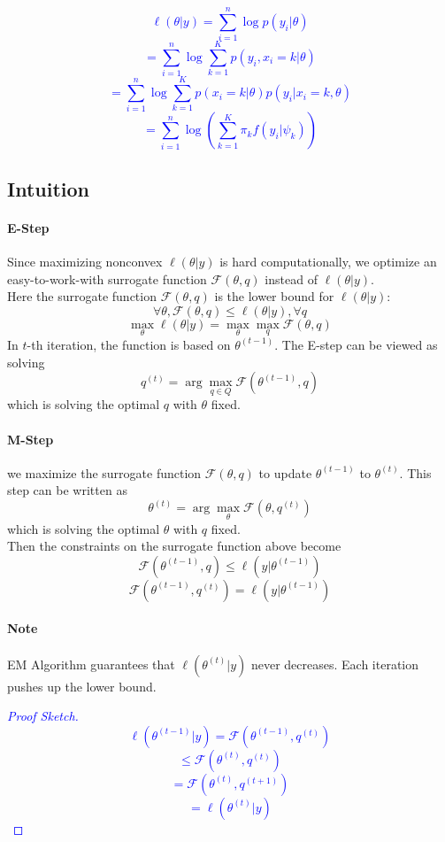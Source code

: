 \documentclass[12pt]{book}
\theoremstyle{definition}
\theoremstyle{remark}
\begin{document}
\textcolor{blue}{
\[\ell (\theta|y) = \sum_{i=1}^n \log p(y_i|\theta)\]
\[= \sum_{i=1}^n \log \sum_{k=1}^K p(y_i, x_i = k|\theta)\]
\[= \sum_{i=1}^n \log \sum_{k=1}^K p(x_i = k|\theta)p(y_i|x_i = k,\theta)\]
\[ = \sum_{i=1}^n \log (\sum_{k=1}^K\pi_k f(y_i|\psi_k))\]
}

\subsection{Intuition}
\paragraph{E-Step}
Since maximizing nonconvex $\ell (\theta|y)$ is hard computationally, we optimize an easy-to-work-with surrogate function $\mathcal{F}(\theta, q)$ instead of $\ell (\theta|y)$. \\
Here the surrogate function $\mathcal{F}(\theta, q)$ is the lower bound for $\ell (\theta|y)$:\\
\[\forall \theta, \mathcal{F}(\theta, q) \le \ell (\theta|y), \forall q\]
\[\underset{\theta}{\max}\ell (\theta|y) = \underset{\theta}{\max}\underset{q}{\max} \mathcal{F}(\theta, q)\]
In $t$-th iteration, the function is based on $\theta^{(t-1)}$. The E-step can be viewed as solving
\[q^{(t)} = \arg\underset{q\in Q}{\max}\mathcal{F}(\theta^{(t-1)}, q)\]
which is solving the optimal $q$ with $\theta$ fixed. 
\paragraph{M-Step}
we maximize the surrogate function $\mathcal{F}(\theta, q)$ to update $\theta^{(t-1)}$ to $\theta^{(t)}$. This step can be written as \[\theta^{(t)} = \arg\underset{\theta}{\max}\mathcal{F}(\theta, q^{(t)})\]
which is solving the optimal $\theta$ with $q$ fixed.\\

Then the constraints on the surrogate function above become
\[\mathcal{F}(\theta^{(t-1)},q)\le \ell(y|\theta^{(t-1)})\]
\[\mathcal{F}(\theta^{(t-1)},q^{(t)}) = \ell(y|\theta^{(t-1)})\]

\paragraph{Note}
EM Algorithm guarantees that $\ell(\theta^{(t)}|y)$ never decreases. Each iteration pushes up the lower bound. 
\textcolor{blue}{
\begin{proof}[Proof Sketch]
    \[
\ell(\theta^{(t-1)}|y) = \mathcal{F}(\theta^{(t-1)}, q^{(t)}) \]\[\leq \mathcal{F}(\theta^{(t)}, q^{(t)})\]\[ = \mathcal{F}(\theta^{(t)}, q^{(t+1)}) \]\[= \ell(\theta^{(t)}|y)\]
\end{proof}
}
\end{document}
